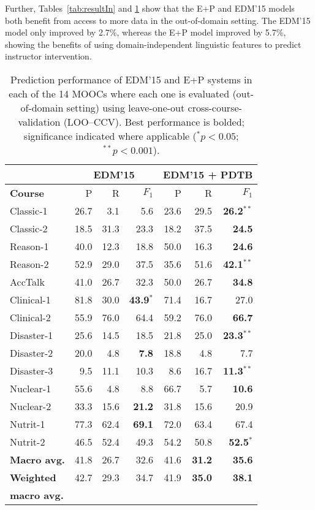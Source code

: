 \documentclass[letterpaper]{article}
\begin{document}
Further, Tables~\ref{tab:resultIn} and \ref{tab:resultOut} show that 
the E+P and EDM'15 models both benefit from access to more data in 
the out-of-domain setting. The EDM'15 model only improved by 2.7\%, 
whereas the E+P model improved by 5.7\%, showing the benefits 
of using domain-independent linguistic features to predict instructor 
intervention.
\begin{table}
\centering
\def\arraystretch{1.15}%
\small
\begin{tabular}{|l|r|r|r||r|r|r|}
\hline 
&
\multicolumn{3}{c||}{EDM'15} & 
\multicolumn{3}{c|}{EDM'15 + PDTB}
\\
\hline
\bf Course&  P&  R& $F_1$& P&  R& $F_1$\\
\hline
{\sc Classic-1} & 26.7& 3.1& 5.6& 23.6& 29.5& \textbf{26.2}$^{**}$\\
\hline
{\sc Classic-2} & 18.5& 31.3& 23.3& 18.2& 37.5& \textbf{24.5}\\
\hline
{\sc Reason-1} & 40.0& 12.3& 18.8& 50.0& 16.3& \textbf{24.6}\\
\hline
{\sc Reason-2} & 52.9& 29.0& 37.5& 35.6& 51.6& \textbf{42.1}$^{**}$\\
\hline
\hline
{\sc AccTalk} & 41.0& 26.7& 32.3& 50.0& 26.7& \textbf{34.8}\\
\hline
{\sc Clinical-1} & 81.8& 30.0& \textbf{43.9}$^*$& 71.4& 16.7& 27.0\\
\hline
{\sc Clinical-2} & 55.9& 76.0& 64.4& 59.2& 76.0& \textbf{66.7}\\
\hline
{\sc Disaster-1} & 25.6& 14.5& 18.5& 21.8& 25.0& \textbf{23.3}$^{**}$\\
\hline
{\sc Disaster-2} & 20.0& 4.8& \textbf{7.8}& 18.8& 4.8& 7.7 \\
\hline
{\sc Disaster-3} & 9.5& 11.1& 10.3& 8.6& 16.7& \textbf{11.3}$^{**}$\\
\hline
{\sc Nuclear-1} & 55.6& 4.8& 8.8& 66.7& 5.7& \textbf{10.6}\\
\hline
{\sc Nuclear-2} & 33.3& 15.6& \textbf{21.2}& 31.8& 15.6& 20.9\\
\hline
{\sc Nutrit-1} & 77.3& 62.4& \textbf{69.1}& 72.0& 63.4& 67.4\\
\hline
{\sc Nutrit-2} & 46.5& 52.4& 49.3& 54.2& 50.8& \textbf{52.5}$^*$\\
\hline
\hline
\textbf{Macro avg.}& 41.8& 26.7& 32.6& 41.6& \textbf{31.2}& \textbf{35.6}\\
\hline
\textbf{Weighted} & 42.7& 29.3& 34.7& 41.9& \textbf{35.0}& \textbf{38.1}\\
\textbf{macro avg.}& & & & & &\\
\hline
\end{tabular}
\caption{Prediction performance of EDM'15 and E+P systems in each of
  the 14 MOOCs where each one is evaluated (out-of-domain setting)
  using leave-one-out cross-course-validation (LOO--CCV). Best
  performance is bolded; significance indicated where applicable
  ($^* p < 0.05$; $^{**}p < 0.001$).}
\label{tab:resultOut}
\end{table}
\end{document}
